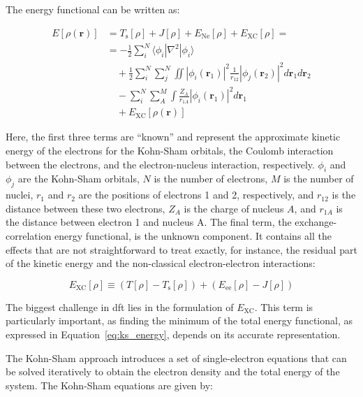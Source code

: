 The energy functional can be written as:

\begin{equation}
    \begin{aligned}
    E[\rho(\mathbf{r})] &= T_{\text{s}}[\rho] + J[\rho] + E_{\text{Ne}}[\rho] + E_{\text{XC}}[\rho] =  \\
    &= -\frac{1}{2} \sum_{i}^{N} \langle \phi_i | \nabla^2 | \phi_i \rangle \\
    &\quad + \frac{1}{2} \sum_{i}^{N} \sum_{j}^{N} \iint \left| \phi_i(\mathbf{r}_1) \right|^2 \frac{1}{r_{12}} \left| \phi_j(\mathbf{r}_2) \right|^2 d\mathbf{r}_1 d\mathbf{r}_2 \\
    &\quad - \sum_{i}^{N} \sum_{A}^{M} \int \frac{Z_A}{r_{1A}} \left| \phi_i(\mathbf{r}_1) \right|^2 d\mathbf{r}_1 \\
    &\quad + E_{\text{XC}}[\rho(\mathbf{r})] 
    \label{eq:ks_energy}
    \end{aligned}
\end{equation}

Here, the first three terms are “known” and represent the approximate kinetic energy of the electrons for the Kohn-Sham orbitals, the Coulomb interaction between the electrons, and the electron-nucleus interaction, respectively. $\phi_i$ and $\phi_j$ are the Kohn-Sham orbitals, $N$ is the number of electrons, $M$ is the number of nuclei, $r_1$ and $r_2$ are the positions of electrons 1 and 2, respectively, and $r_{12}$ is the distance between these two electrons, $Z_A$ is the charge of nucleus $A$, and $r_{1A}$ is the distance between electron 1 and nucleus A. The final term, the exchange-correlation energy functional, is the unknown component. It contains all the effects that are not straightforward to treat exactly, for instance, the residual part of the kinetic energy and the non-classical electron-electron interactions:

\begin{equation}
    E_{\text{XC}}[\rho] \equiv (T[\rho] - T_{\text{s}}[\rho]) + (E_{\text{ee}}[\rho] - J[\rho])
    \label{eq:xc_energy}
\end{equation}

The biggest challenge in \ac{dft} lies in the formulation of $E_{\text{XC}}$. This term is particularly important, as finding the minimum of the total energy functional, as expressed in Equation~\ref{eq:ks_energy}, depends on its accurate representation.

The Kohn-Sham approach introduces a set of single-electron equations that can be solved iteratively to obtain the electron density and the total energy of the system. The Kohn-Sham equations are given by:

